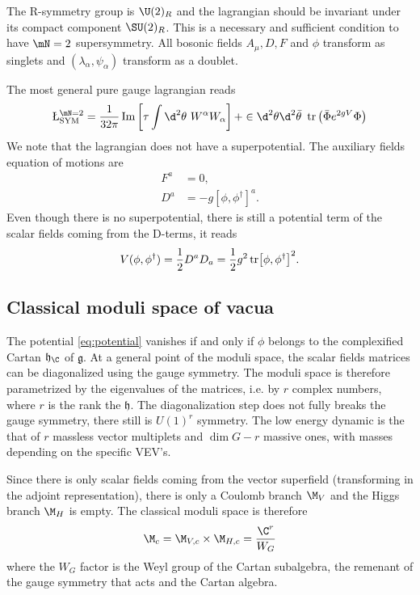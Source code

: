 \documentclass{worksheetclass}
\begin{document}
        The R-symmetry group is $\U(2)_R$ and the lagrangian should be invariant under its compact component $\SU(2)_R$. This is a necessary and sufficient condition to have $\mN=2$ supersymmetry. All bosonic fields $A_\mu,D,F$ and $\phi$ transform as singlets and $(\lambda_\alpha,\psi_\alpha)$ transform as a doublet.

        The most general pure gauge lagrangian reads
        \begin{eqnarray}
            \L^{\mN=2}_{\text{SYM}} = \frac{1}{32\pi}\Im\left[\tau\int\d^2\theta~W^\alpha W_\alpha\right] + \in\d^2\theta\d^2\bar{\theta}~\tr\left(\bar{\Phi}e^{2gV}\Phi\right)\label{eq:N2lag}
        \end{eqnarray}
        We note that the lagrangian does not have a superpotential. The auxiliary fields equation of motions are
        \begin{align}
            F^a &= 0,\\
            D^a &= -g[\phi,\phi^\dagger]^a.
        \end{align}
        Even though there is no superpotential, there is still a potential term of the scalar fields coming from the D-terms, it reads
        \begin{eqnarray}
            V(\phi,\phi^\dagger)=\frac{1}{2}D^aD_a=\frac{1}{2}g^2\tr[\phi,\phi^\dagger]^2.\label{eq:potential}
        \end{eqnarray}

    \subsection{Classical moduli space of vacua}

        The potential \eqref{eq:potential} vanishes if and only if $\phi$ belongs to the complexified Cartan $\mathfrak{h}_\C$ of $\mathfrak{g}$. At a general point of the moduli space, the scalar fields matrices can be diagonalized using the gauge symmetry. The moduli space is therefore parametrized by the eigenvalues of the matrices, i.e. by $r$ complex numbers, where $r$ is the rank the $\mathfrak{h}$. The diagonalization step does not fully breaks the gauge symmetry, there still is $U(1)^r$ symmetry. The low energy dynamic is the that of $r$ massless vector multiplets and $\dim G-r$ massive ones, with masses depending on the specific VEV's.

        Since there is only scalar fields coming from the vector superfield (transforming in the adjoint representation), there is only a Coulomb branch $\M_V$ and the Higgs branch $\M_H$ is empty. The classical moduli space is therefore
        \begin{eqnarray}
            \M_c = \M_{V,c}\times\M_{H,c}=\frac{\C^r}{W_G}\label{eq:classicalmodulispaceproduct}
        \end{eqnarray}
        where the $W_G$ factor is the Weyl group of the Cartan subalgebra, the remenant of the gauge symmetry that acts and the Cartan algebra.
\end{document}
